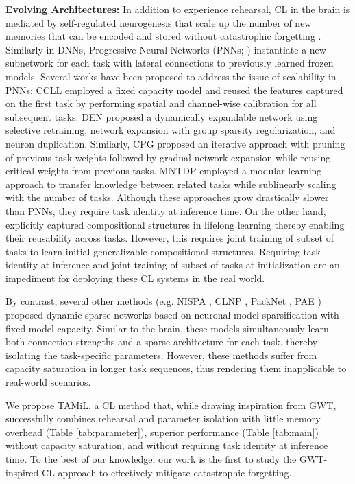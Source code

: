 \documentclass{article} %
\begin{document}
\textbf{Evolving Architectures:}
In addition to experience rehearsal, CL in the brain is mediated by self-regulated neurogenesis that scale up the number of new memories that can be encoded and stored without catastrophic forgetting \citep{kudithipudi2022biological}. Similarly in DNNs, Progressive Neural Networks (PNNs; \cite{rusu2016progressive}) instantiate a new subnetwork for each task with lateral connections to previously learned frozen models. Several works have been proposed to address the issue of scalability in PNNs: CCLL \citep{NEURIPS2020_b3b43aee} employed a fixed capacity model and reused the features captured on the first task by performing spatial and channel-wise calibration for all subsequent tasks. DEN \citep{yoon2018lifelong} proposed a dynamically expandable network using selective retraining, network expansion with group sparsity regularization, and neuron duplication. Similarly, CPG \citep{hung2019compacting} proposed an iterative approach with pruning of previous task weights followed by gradual network expansion while reusing critical weights from previous tasks.  MNTDP \citep{veniat2020efficient} employed a modular learning approach to transfer knowledge between related tasks while sublinearly scaling with the number of tasks. Although these approaches grow drastically slower than PNNs, they require task identity at inference time.  
On the other hand, \citet{mendez2020lifelong} explicitly captured compositional structures in lifelong learning thereby enabling their reusability across tasks. However, this requires joint training of subset of tasks to learn initial generalizable compositional structures. Requiring task-identity at inference and joint training of subset of tasks at initialization are an impediment for deploying these CL systems in the real world.

By contrast, several other methods (e.g. NISPA \citep{gurbuz2022nispa}, CLNP \citep{golkar2019continual}, PackNet \citep{mallya2018packnet}, PAE \citep{hung2019increasingly}) proposed dynamic sparse networks based on neuronal model sparsification with fixed model capacity. Similar to the brain, these models simultaneously learn both connection strengths and a sparse architecture for each task, thereby isolating the task-specific parameters. However, these methods suffer from capacity saturation in longer task sequences, thus rendering them inapplicable to real-world scenarios.  

We propose TAMiL, a CL method that, while drawing inspiration from GWT, successfully combines rehearsal and parameter isolation with little memory overhead (Table \ref{tab:parameter}), superior performance (Table \ref{tab:main}) without capacity saturation, and without requiring task identity at inference time. To the best of our knowledge, our work is the first to study the GWT-inspired CL approach to effectively mitigate catastrophic forgetting. 
\end{document}
